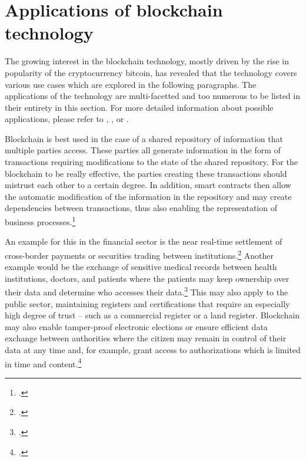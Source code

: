 \section{Applications of blockchain technology} \label{sec:SmartContracts}
The growing interest in the blockchain technology, mostly driven by the rise in popularity of the cryptocurrency bitcoin, has revealed that the technology covers various use cases which are explored in the following paragraphs. The applications of the technology are multi-facetted and too numerous to be listed in their entirety in this section. For more detailed information about possible applications, please refer to \cite{AntonopolousAndreasM..2017}, \cite{SchatskybitcoinBlockchaincoming2015}, or \cite{Schutte.2017}.

Blockchain is best used in the case of a shared repository of information that multiple parties access. These parties all generate information in the form of transactions requiring modifications to the state of the shared repository. For the blockchain to be really effective, the parties creating these transactions should mistrust each other to a certain degree. In addition, smart contracts then allow the automatic modification of the information in the repository and may create dependencies between transactions, thus also enabling the representation of business processes.\footcites[Cf.][p.8]{MulliganBlockchainHypePractical2018}[cf.][p.5]{Tapscott.2017}[cf.][p.166]{DannenIntroducingethereumsolidity2017}

An example for this in the financial sector is the near real-time settlement of cross-border payments or securities trading between institutions.\footcite[Cf.][]{SchatskybitcoinBlockchaincoming2015} Another example would be the exchange of sensitive medical records between health institutions, doctors, and patients where the patients may keep ownership over their data and determine who accesses their data.\footcites[Cf.][p.170]{DannenIntroducingethereumsolidity2017}[cf.][p.18]{Schutte.2017} This may also apply to the public sector, maintaining registers and certifications that require an especially high degree of trust – such as a commercial register or a land register. Blockchain may also enable tamper-proof electronic elections or ensure efficient data exchange between authorities where the citizen may remain in control of their data at any time and, for example, grant access to authorizations which is limited in time and content.\footcites[Cf.][p.18]{Schutte.2017}  


